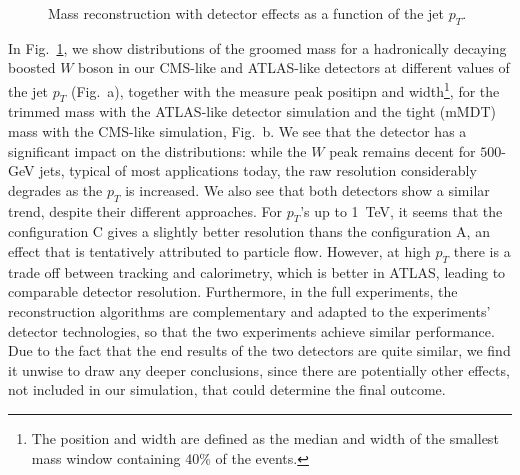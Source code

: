 \documentclass[11pt]{cernrep}
\begin{document}
\begin{figure}
  \caption{Mass reconstruction with detector effects as a function of the jet $p_T$.}
  \label{jetsub_2prong_fig:mass-detector}
\end{figure}

In Fig.~\ref{jetsub_2prong_fig:mass-detector}, we show distributions
of the groomed mass for a hadronically decaying boosted $W$ boson in
our CMS-like and ATLAS-like detectors at different values of the jet
$p_T$ (Fig.~\label{jetsub_2prong_fig:mass-detector}a), together with
the measure peak positipn and width\footnote{The position and width
  are defined as the median and width of the smallest mass window
  containing 40\% of the events.}, for the trimmed mass with the
ATLAS-like detector simulation and the tight (mMDT) mass with the
CMS-like simulation, Fig.~\label{jetsub_2prong_fig:mass-detector}b.
%
We see that the detector has a significant impact on the
distributions: while the $W$ peak remains decent for $500$-GeV jets,
typical of most applications today, the raw resolution considerably
degrades as the $p_T$ is increased.
%
We also see that both detectors show a similar trend, despite their
different approaches.
%
For $p_T$'s up to 1~TeV, it seems that the configuration C gives a
slightly better resolution thans the configuration A, an effect that
is tentatively attributed to particle flow.
%
However, at high $p_T$ there is a trade off between tracking and
calorimetry, which is better in ATLAS, leading to comparable detector
resolution.
%
Furthermore, in the full experiments, the reconstruction algorithms
are complementary and adapted to the experiments' detector
technologies, so that the two experiments achieve similar performance.
%
Due to the fact that the end results of the two detectors are quite
similar, we find it unwise to draw any deeper conclusions, since there
are potentially other effects, not included in our simulation, that
could determine the final outcome.
\end{document}
